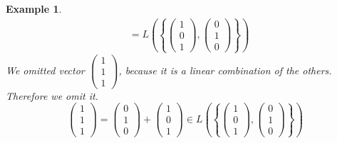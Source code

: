 \documentclass[a4paper,landscape,twocolumn]{article}
\newcommand\set[1]{\left\{#1\right\}}
\newtheorem{ex}{Example}
\begin{document}
\begin{ex}
\begin{align*}
    &= L\left(\set{\begin{pmatrix} 1 \\ 0 \\ 1 \end{pmatrix}, \begin{pmatrix} 0 \\ 1 \\ 0 \end{pmatrix}}\right)
  \end{align*}
  We omitted vector $\begin{pmatrix} 1 \\ 1 \\ 1 \end{pmatrix}$, because it is a linear combination of the others.
  Therefore we omit it.
  \[
      \begin{pmatrix} 1 \\ 1 \\ 1 \end{pmatrix} =
      \begin{pmatrix} 0 \\ 1 \\ 0 \end{pmatrix} +
      \begin{pmatrix} 1 \\ 0 \\ 1 \end{pmatrix} \in
      L\left(\set{\begin{pmatrix} 1 \\ 0 \\ 1 \end{pmatrix}, \begin{pmatrix} 0 \\ 1 \\ 0 \end{pmatrix}}\right)
  \]
\end{ex}
\end{document}
